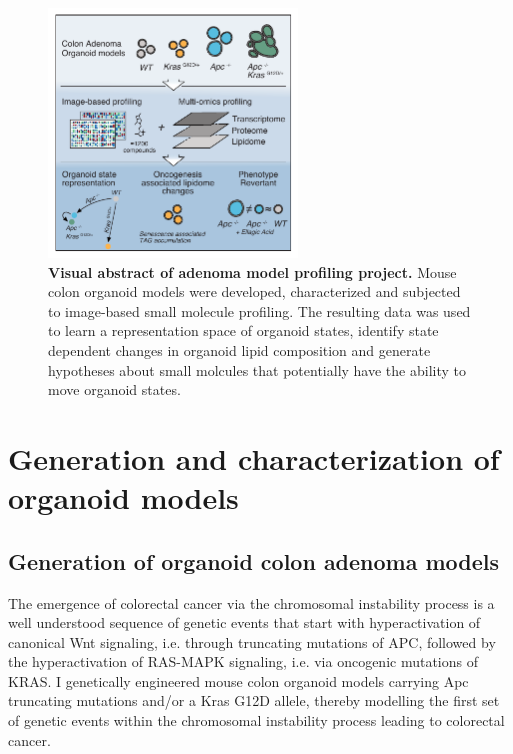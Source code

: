 \begin{flushleft}
\begin{figure}[h]
\centering
\includegraphics[width=250,
                height=\textheight,
                keepaspectratio]{figures/adenomaprofiling/pdf/fig_0_2.pdf}
\caption[Visual abstract of adenoma model profiling project]{\textbf{Visual abstract of adenoma model profiling project.} Mouse colon organoid models were developed, characterized and subjected to image-based small molecule profiling. The resulting data was used to learn a representation space of organoid states, identify state dependent changes in organoid lipid composition and generate hypotheses about small molcules that potentially have the ability to move organoid states.}
\label{fig_a02}
\end{figure}
\bigbreak



\section{Generation and characterization of organoid models}
\subsection{Generation of organoid colon adenoma models}
The emergence of colorectal cancer via the chromosomal instability process is a well understood sequence of genetic events that start with hyperactivation of canonical Wnt signaling, i.e. through truncating mutations of APC, followed by the hyperactivation of RAS-MAPK signaling, i.e. via oncogenic mutations of KRAS. I genetically engineered mouse colon organoid models carrying Apc truncating mutations and/or a Kras G12D allele, thereby modelling the first set of genetic events within the chromosomal instability process leading to colorectal cancer. 


\end{flushleft}
